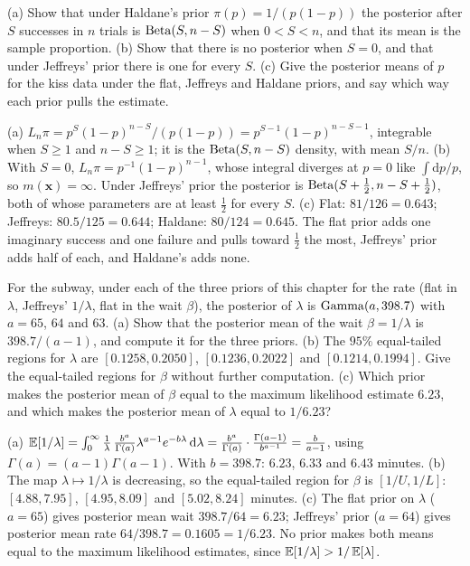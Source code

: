 \begin{exercise}
\label{ex:jeff-haldane}
(a) Show that under Haldane's prior $\pi(p) = 1/(p(1-p))$ the posterior after $S$ successes in $n$ trials is $\mathrm{Beta}(S, n - S)$ when $0 < S < n$, and that its mean is the sample proportion. (b) Show that there is no posterior when $S = 0$, and that under Jeffreys' prior there is one for every $S$. (c) Give the posterior means of $p$ for the kiss data under the flat, Jeffreys and Haldane priors, and say which way each prior pulls the estimate.
\end{exercise}
\begin{solution}
(a) $L_n\pi = p^S(1-p)^{n-S}/(p(1-p)) = p^{S-1}(1-p)^{n-S-1}$, integrable when $S \geq 1$ and $n - S \geq 1$; it is the $\mathrm{Beta}(S, n - S)$ density, with mean $S/n$. (b) With $S = 0$, $L_n\pi = p^{-1}(1-p)^{n-1}$, whose integral diverges at $p = 0$ like $\int \mathrm{d}p/p$, so $m(\mathbf{x}) = \infty$. Under Jeffreys' prior the posterior is $\mathrm{Beta}(S + \frac12, n - S + \frac12)$, both of whose parameters are at least $\frac12$ for every $S$. (c) Flat: $81/126 = 0.643$; Jeffreys: $80.5/125 = 0.644$; Haldane: $80/124 = 0.645$. The flat prior adds one imaginary success and one failure and pulls toward $\frac12$ the most, Jeffreys' prior adds half of each, and Haldane's adds none.
\end{solution}

\begin{exercise}
\label{ex:jeff-subway-wait}
For the subway, under each of the three priors of this chapter for the rate (flat in $\lambda$, Jeffreys' $1/\lambda$, flat in the wait $\beta$), the posterior of $\lambda$ is $\mathrm{Gamma}(a, 398.7)$ with $a = 65$, $64$ and $63$. (a) Show that the posterior mean of the wait $\beta = 1/\lambda$ is $398.7/(a - 1)$, and compute it for the three priors. (b) The $95\%$ equal-tailed regions for $\lambda$ are $[0.1258, 0.2050]$, $[0.1236, 0.2022]$ and $[0.1214, 0.1994]$. Give the equal-tailed regions for $\beta$ without further computation. (c) Which prior makes the posterior mean of $\beta$ equal to the maximum likelihood estimate $6.23$, and which makes the posterior mean of $\lambda$ equal to $1/6.23$?
\end{exercise}
\begin{solution}
(a) $\operatorname*{\mathbb{E}}[1/\lambda] = \int_0^\infty \frac1\lambda\,\frac{b^a}{\Gamma(a)}\lambda^{a-1}e^{-b\lambda}\,\mathrm{d}\lambda = \frac{b^a}{\Gamma(a)}\cdot\frac{\Gamma(a-1)}{b^{a-1}} = \frac{b}{a-1}$, using $\Gamma(a) = (a-1)\Gamma(a-1)$. With $b = 398.7$: $6.23$, $6.33$ and $6.43$ minutes. (b) The map $\lambda \mapsto 1/\lambda$ is decreasing, so the equal-tailed region for $\beta$ is $[1/U, 1/L]$: $[4.88, 7.95]$, $[4.95, 8.09]$ and $[5.02, 8.24]$ minutes. (c) The flat prior on $\lambda$ ($a = 65$) gives posterior mean wait $398.7/64 = 6.23$; Jeffreys' prior ($a = 64$) gives posterior mean rate $64/398.7 = 0.1605 = 1/6.23$. No prior makes both means equal to the maximum likelihood estimates, since $\operatorname*{\mathbb{E}}[1/\lambda] > 1/\operatorname*{\mathbb{E}}[\lambda]$.
\end{solution}

